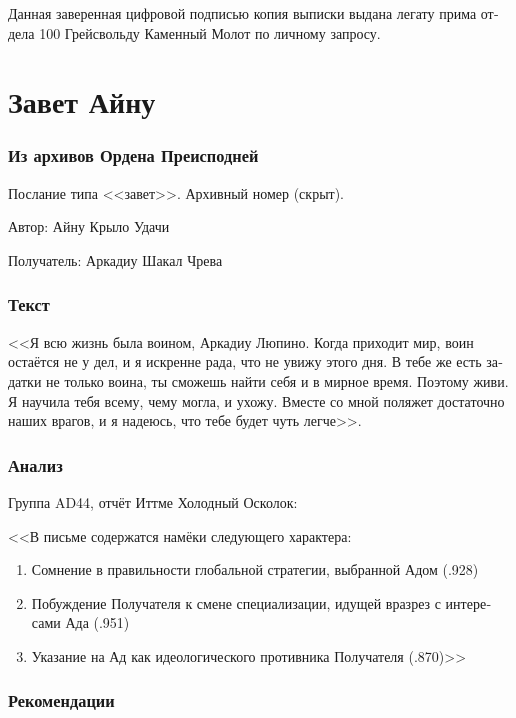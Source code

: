 \documentclass[a4paper,12pt,fleqn]{book}\usepackage{cooltooltips}\usepackage{polyglossia}\setdefaultlanguage[babelshorthands=true]{russian}\setotherlanguage{english}\defaultfontfeatures{Ligatures=TeX,Mapping=tex-text} \usepackage{xcolor}\definecolor{lightgray}{HTML}{bbbbbb}\color{lightgray}\newcommand{\ml}[3]{\textenglish{\textcolor{black}{#3}}}
\begin{document}
{Данная заверенная цифровой подписью копия выписки выдана легату прима отдела 100 Грейсвольду Каменный Молот по личному запросу.

\section{Завет Айну}

\subsubsection{Из архивов Ордена Преисподней}

Послание типа <<завет>>. Архивный номер (скрыт).

Автор: Айну Крыло Удачи

Получатель: Аркадиу Шакал Чрева

\subsubsection{Текст}

<<Я всю жизнь была воином, Аркадиу Люпино.
Когда приходит мир, воин остаётся не у дел, и я искренне рада, что не увижу этого дня.
В тебе же есть задатки не только воина, ты сможешь найти себя и в мирное время.
Поэтому живи.
Я научила тебя всему, чему могла, и ухожу.
Вместе со мной поляжет достаточно наших врагов, и я надеюсь, что тебе будет чуть легче>>.

\subsubsection{Анализ}

Группа AD44, отчёт Иттме Холодный Осколок:

<<В письме содержатся намёки следующего характера:

\begin{enumerate}
\item Сомнение в правильности глобальной стратегии, выбранной Адом (.928)
\item Побуждение Получателя к смене специализации, идущей вразрез с интересами Ада (.951)
\item Указание на Ад как идеологического противника Получателя (.870)>>
\end{enumerate}

\subsubsection{Рекомендации}

}
\end{document}
